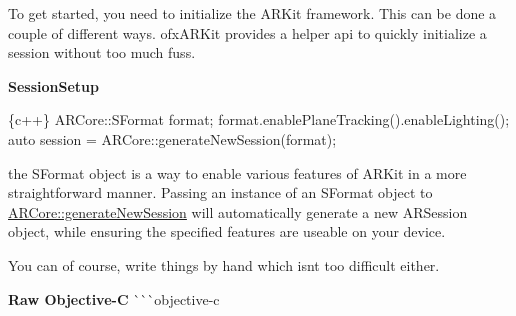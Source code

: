 To get started, you need to initialize the A\+R\+Kit framework. This can be done a couple of different ways. ofx\+A\+R\+Kit provides a helper api to quickly initialize a session without too much fuss.

{\bfseries Session\+Setup} 
\begin{DoxyCode}
\{c++\}
    ARCore::SFormat format;
    format.enablePlaneTracking().enableLighting();
    auto session = ARCore::generateNewSession(format);
\end{DoxyCode}


the {\ttfamily S\+Format} object is a way to enable various features of A\+R\+Kit in a more straightforward manner. Passing an instance of an {\ttfamily S\+Format} object to {\ttfamily \mbox{\hyperlink{namespace_a_r_core_a66ae704f1eff4b085765cc73635db8eb}{A\+R\+Core\+::generate\+New\+Session}}} will automatically generate a new {\ttfamily A\+R\+Session} object, while ensuring the specified features are useable on your device.

You can of course, write things by hand which isn\textquotesingle{}t too difficult either.

{\bfseries Raw Objective-\/C} \`{}\`{}\`{}objective-\/c 